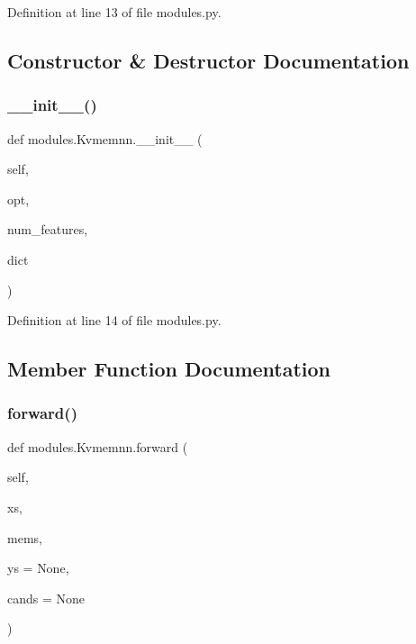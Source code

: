 Definition at line 13 of file modules.\+py.



\subsection{Constructor \& Destructor Documentation}
\mbox{\label{classmodules_1_1Kvmemnn_ae8fc66293ceb70c96f17600dc367b19c}} 
\subsubsection{\texorpdfstring{\+\_\+\+\_\+init\+\_\+\+\_\+()}{\_\_init\_\_()}}
{\footnotesize\ttfamily def modules.\+Kvmemnn.\+\_\+\+\_\+init\+\_\+\+\_\+ (\begin{DoxyParamCaption}\item[{}]{self,  }\item[{}]{opt,  }\item[{}]{num\+\_\+features,  }\item[{}]{dict }\end{DoxyParamCaption})}



Definition at line 14 of file modules.\+py.



\subsection{Member Function Documentation}
\mbox{\label{classmodules_1_1Kvmemnn_a85a9be2539bc746cfb162d450067c551}} 
\subsubsection{\texorpdfstring{forward()}{forward()}}
{\footnotesize\ttfamily def modules.\+Kvmemnn.\+forward (\begin{DoxyParamCaption}\item[{}]{self,  }\item[{}]{xs,  }\item[{}]{mems,  }\item[{}]{ys = {\ttfamily None},  }\item[{}]{cands = {\ttfamily None} }\end{DoxyParamCaption})}



